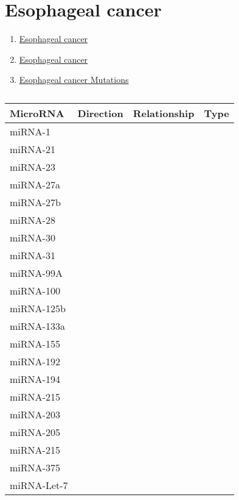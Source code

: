 
\section{Esophageal cancer}

\begin{enumerate}
\item \href{https://www.omim.org/entry/133239?search=Esophageal%20cancer&highlight=%28cancer%7Ccancerous%29%20esophageal}{Esophageal cancer}
\item \href{https://www.malacards.org/card/esophageal_cancer}{Esophageal cancer}
\item \href{https://cancer.sanger.ac.uk/cosmic/search?q=esophageal+cancer}{Esophageal cancer Mutations}
\end{enumerate}

\begin{table}[H]\centering
  \caption {\cite{key400} \cite{480}}
	\begin{tabular}{p{1cm}p{4cm}p{3cm}}
		 MicroRNA & Direction & Relationship & Type\\
		\hline
		miRNA-1 & & & \\
		miRNA-21 & & & \\
		miRNA-23 & & & \\
		miRNA-27a & & & \\
		miRNA-27b & & & \\
		miRNA-28 & & & \\
		miRNA-30 & & & \\
		miRNA-31 & & & \\
		miRNA-99A & & & \\
		miRNA-100 & & & \\
		miRNA-125b & & & \\
		miRNA-133a & & & \\
		miRNA-155 & & & \\
		miRNA-192 & & & \\
		miRNA-194 & & & \\
		miRNA-215 & & & \\
		miRNA-203 & & & \\
		miRNA-205 & & & \\
		miRNA-215 & & & \\
		miRNA-375 & & & \\
		\hline
		miRNA-Let-7 & & & \\
	\end{tabular}
\end{table}




